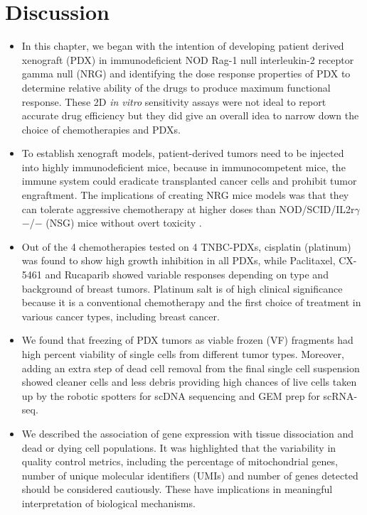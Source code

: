 \section{Discussion}

\begin{itemize}

 \item In this chapter, we began with the intention of developing patient derived xenograft (PDX) in immunodeficient NOD Rag-1 null interleukin-2 receptor gamma null (NRG) and identifying the dose response properties of PDX to determine relative ability of the drugs to produce maximum functional response. These 2D \textit{in vitro} sensitivity assays were not ideal to report accurate drug efficiency but they did give an overall idea to narrow down the choice of chemotherapies and PDXs.  

 \item To establish xenograft models, patient-derived tumors need to be injected into highly immunodeficient mice, because in immunocompetent mice, the immune system could eradicate transplanted cancer cells and prohibit tumor engraftment. The implications of creating \ac{NRG} mice models was that they can tolerate aggressive chemotherapy at higher doses than NOD/SCID/IL2r$\gamma$ $-$/$-$ (NSG) mice without overt toxicity \cite{barve2018comparative}. 


\item Out of the 4 chemotherapies tested on 4 TNBC-PDXs, cisplatin (platinum) was found to show high growth inhibition in all PDXs, while Paclitaxel, CX-5461 and Rucaparib showed variable responses depending on type and background of breast tumors. Platinum salt is of high clinical significance because it is a conventional chemotherapy and the first choice of treatment in various cancer types, including breast cancer.

\item We found that freezing of PDX tumors as viable frozen (VF) fragments had high percent viability of single cells from different tumor types. Moreover, adding an extra step of dead cell removal from the final single cell suspension showed cleaner cells and less debris  providing high chances of live cells taken up by the robotic spotters for scDNA sequencing and GEM prep for scRNA-seq.

\item We described the association of gene expression with tissue dissociation and dead or dying cell populations. It was highlighted that the variability in quality control metrics, including the percentage of mitochondrial genes, number of unique molecular identifiers (UMIs) and number of genes detected should be considered cautiously. These have implications in meaningful interpretation of biological mechanisms.


\end{itemize}
